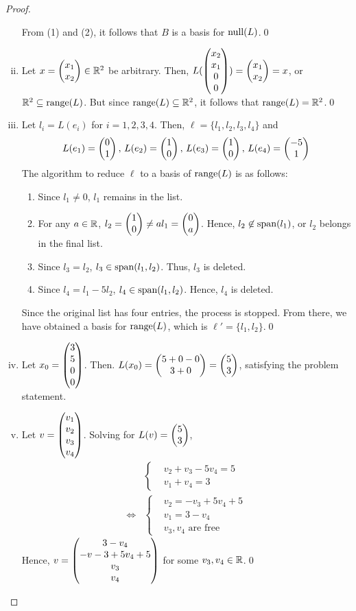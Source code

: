 \begin{proof}
\begin{enumerate}[(i)]
        From (1) and (2), it follows that $B$ is a basis for $\textnormal{null}(L)$.\qed
        \item Let $x=\begin{pmatrix} x_1\\ x_2\end{pmatrix}\in\mathbb R^2$ be arbitrary. Then, $L(\begin{pmatrix} x_2\\ x_1\\0 \\ 0\end{pmatrix})=\begin{pmatrix} x_1\\ x_2\end{pmatrix}=x$, or $\mathbb R^2\subseteq\textnormal{range}(L)$.
        But since $\textnormal{range}(L)\subseteq\mathbb R^2$, it follows that $\textnormal{range}(L)=\mathbb R^2$.\qed
        \item Let $l_i=L(e_i)$ for $i=1,2,3,4$.
        Then, $\ell=\{l_1,l_2,l_3,l_4\}$ and 
        \[
            \begin{aligned}
                L(e_1)=\begin{pmatrix} 0\\ 1\end{pmatrix},\,L(e_2)=\begin{pmatrix} 1\\ 0\end{pmatrix},\,L(e_3)=\begin{pmatrix} 1\\ 0\end{pmatrix},\,L(e_4)=\begin{pmatrix} -5\\ 1\end{pmatrix}
            \end{aligned}
        \]
        The algorithm to reduce $\ell$ to a basis of $\textnormal{range}(L)$ is as follows:
        \begin{enumerate}[Step (1):]
        \item Since $l_1\not=0$, $l_1$ remains in the list.
        \item For any $a\in\mathbb R$, $l_2=\begin{pmatrix} 1\\ 0\end{pmatrix}\not=al_1=\begin{pmatrix} 0\\ a\end{pmatrix}$. Hence, $l_2\not\in\textnormal{span}(l_1)$, or $l_2$ belongs in the final list.
        \item Since $l_3=l_2$, $l_3\in\textnormal{span}(l_1,l_2)$. Thus, $l_3$ is deleted.
        \item Since $l_4=l_1-5l_2$, $l_4\in\textnormal{span}(l_1,l_2)$. Hence, $l_4$ is deleted.
        \end{enumerate}
        Since the original list has four entries, the process is stopped. From there, we have obtained a basis for $\textnormal{range}(L)$, which is $\ell'=\{l_1,l_2\}$.\qed

        \item Let $x_0=\begin{pmatrix} 3\\ 5\\0 \\ 0\end{pmatrix}$. Then. $L(x_0)=\begin{pmatrix} 5+0-0\\ 3+0\end{pmatrix}=\begin{pmatrix} 5\\ 3\end{pmatrix}$, satisfying the problem statement.
        \item Let $v=\begin{pmatrix} v_1\\ v_2\\v_3 \\ v_4\end{pmatrix}$. Solving for $L(v)=\begin{pmatrix} 5\\ 3\end{pmatrix}$, 
        \begin{align*}
            &\begin{cases}
                &v_2+v_3-5v_4=5\\
                &v_1+v_4=3
            \end{cases}\\\iff
            &\begin{cases}
                &v_2=-v_3+5v_4+5\\
                &v_1=3-v_4\\
                &v_3,v_4\text{ are free}
            \end{cases}
        \end{align*}
        Hence, $v=\begin{pmatrix} 3-v_4\\ -v-3+5v_4+5\\v_3 \\ v_4\end{pmatrix}$ for some $v_3,v_4\in\mathbb R$.\qed
    \end{enumerate}
    \renewcommand{\qedsymbol}{}
\end{proof}